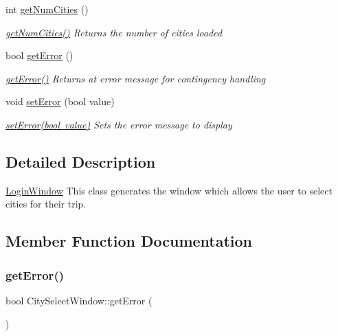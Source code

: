 \begin{DoxyCompactItemize}
int \mbox{\hyperlink{class_city_select_window_a2bee3e628f1249dd6fa5cabc08d63f43}{get\+Num\+Cities}} ()
\begin{DoxyCompactList}\small\item\em \mbox{\hyperlink{class_city_select_window_a2bee3e628f1249dd6fa5cabc08d63f43}{get\+Num\+Cities()}} Returns the number of cities loaded \end{DoxyCompactList}\item 
bool \mbox{\hyperlink{class_city_select_window_a44f594818e36ca35519eaf67c9e9a360}{get\+Error}} ()
\begin{DoxyCompactList}\small\item\em \mbox{\hyperlink{class_city_select_window_a44f594818e36ca35519eaf67c9e9a360}{get\+Error()}} Returns at error message for contingency handling \end{DoxyCompactList}\item 
void \mbox{\hyperlink{class_city_select_window_a0c8d03d414fbb798fff86af385902748}{set\+Error}} (bool value)
\begin{DoxyCompactList}\small\item\em \mbox{\hyperlink{class_city_select_window_a0c8d03d414fbb798fff86af385902748}{set\+Error(bool value)}} Sets the error message to display \end{DoxyCompactList}\end{DoxyCompactItemize}


\subsection{Detailed Description}
\mbox{\hyperlink{class_login_window}{Login\+Window}} This class generates the window which allows the user to select cities for their trip. 

\subsection{Member Function Documentation}
\mbox{\label{class_city_select_window_a44f594818e36ca35519eaf67c9e9a360}} 
\subsubsection{\texorpdfstring{getError()}{getError()}}
{\footnotesize\ttfamily bool City\+Select\+Window\+::get\+Error (\begin{DoxyParamCaption}{ }\end{DoxyParamCaption})}



